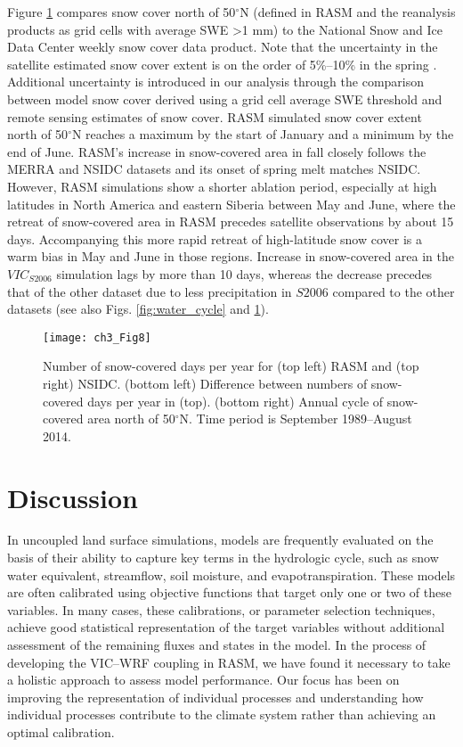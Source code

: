 Figure \ref{fig:snow} compares snow cover north of 50$^{\circ}$N (defined in RASM and the reanalysis products as grid cells with average SWE >1 mm) to the National Snow and Ice Data Center weekly snow cover data product.
Note that the uncertainty in the satellite estimated snow cover extent is on the order of 5\%–10\% in the spring \citep{Brown_2011}.
Additional uncertainty is introduced in our analysis through the comparison between model snow cover derived using a grid cell average SWE threshold and remote sensing estimates of snow cover.
RASM simulated snow cover extent north of 50$^{\circ}$N reaches a maximum by the start of January and a minimum by the end of June.
RASM’s increase in snow-covered area in fall closely follows the MERRA and NSIDC datasets and its onset of spring melt matches NSIDC.
However, RASM simulations show a shorter ablation period, especially at high latitudes in North America and eastern Siberia between May and June, where the retreat of snow-covered area in RASM precedes satellite observations by about 15 days.
Accompanying this more rapid retreat of high-latitude snow cover is a warm bias in May and June in those regions.
Increase in snow-covered area in the $VIC_{S2006}$ simulation lags by more than 10 days, whereas the decrease precedes that of the other dataset due to less precipitation in $S2006$ compared to the other datasets (see also Figs.
\ref{fig:water_cycle} and \ref{fig:snow}).


\begin{figure}
  \centering
  \texttt{[image: ch3\_Fig8]}
  \caption{Number of snow-covered days per year for (top left) RASM and (top right) NSIDC.
  (bottom left) Difference between numbers of snow-covered days per year in (top).
  (bottom right) Annual cycle of snow-covered area north of 50$^{\circ}$N.
  Time period is September 1989–August 2014.}
  \label{fig:snow}
\end{figure}

\section{Discussion}
\label{sec:discussion_ch3}

In uncoupled land surface simulations, models are frequently evaluated on the basis of their ability to capture key terms in the hydrologic cycle, such as snow water equivalent, streamflow, soil moisture, and evapotranspiration.
These models are often calibrated using objective functions that target only one or two of these variables.
In many cases, these calibrations, or parameter selection techniques, achieve good statistical representation of the target variables without additional assessment of the remaining fluxes and states in the model.
In the process of developing the VIC–WRF coupling in RASM, we have found it necessary to take a holistic approach to assess model performance.
Our focus has been on improving the representation of individual processes and understanding how individual processes contribute to the climate system rather than achieving an optimal calibration.


